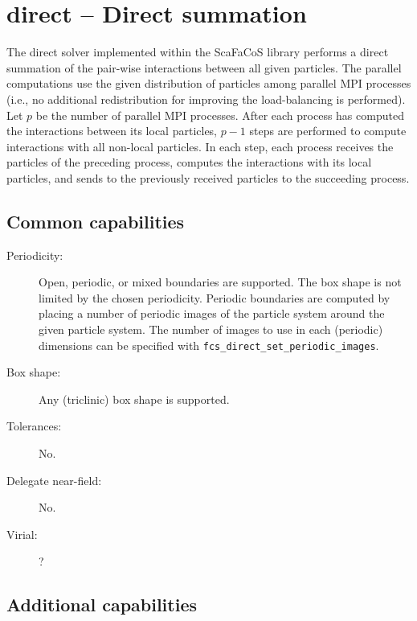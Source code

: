 \chapter{direct -- Direct summation}
\label{cha:direct}


The direct solver implemented within the ScaFaCoS library performs a direct summation of the pair-wise interactions between all given particles.
The parallel computations use the given distribution of particles among parallel MPI processes (i.e., no additional redistribution for improving the load-balancing is performed).
Let $p$ be the number of parallel MPI processes.
After each process has computed the interactions between its local particles, $p-1$ steps are performed to compute interactions with all non-local particles.
In each step, each process receives the particles of the preceding process, computes the interactions with its local particles, and sends to the previously received particles to the succeeding process.

\section*{Common capabilities}

\begin{description}

  \item[Periodicity:]
Open, periodic, or mixed boundaries are supported.
The box shape is not limited by the chosen periodicity.
Periodic boundaries are computed by placing a number of periodic images of the particle system around the given particle system.
The number of images to use in each (periodic) dimensions can be specified with \texttt{fcs\_direct\_set\_periodic\_images}.

  \item[Box shape:] Any (triclinic) box shape is supported.
  
  \item[Tolerances:] No.

  \item[Delegate near-field:] No.

  \item[Virial:] ?

\end{description}

\section*{Additional capabilities}

